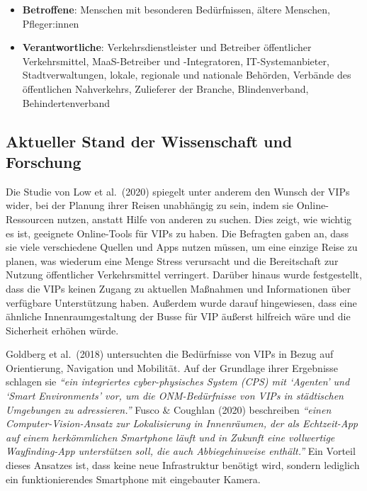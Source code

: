 \documentclass[
]{book}
\providecommand{\tightlist}{%
  \setlength{\itemsep}{0pt}\setlength{\parskip}{0pt}}
\begin{document}
\begin{itemize}
\tightlist
\item
  \textbf{Betroffene}: Menschen mit besonderen Bedürfnissen, ältere Menschen, Pfleger:innen
\item
  \textbf{Verantwortliche}: Verkehrsdienstleister und Betreiber öffentlicher Verkehrsmittel, MaaS-Betreiber und -Integratoren, IT-Systemanbieter, Stadtverwaltungen, lokale, regionale und nationale Behörden, Verbände des öffentlichen Nahverkehrs, Zulieferer der Branche, Blindenverband, Behindertenverband
\end{itemize}

\hypertarget{aktueller-stand-der-wissenschaft-und-forschung-27}{%
\subsection*{Aktueller Stand der Wissenschaft und Forschung}\label{aktueller-stand-der-wissenschaft-und-forschung-27}}

Die Studie von Low et al.~(2020) spiegelt unter anderem den Wunsch der VIPs wider, bei der Planung ihrer Reisen unabhängig zu sein, indem sie Online-Ressourcen nutzen, anstatt Hilfe von anderen zu suchen. Dies zeigt, wie wichtig es ist, geeignete Online-Tools für VIPs zu haben. Die Befragten gaben an, dass sie viele verschiedene Quellen und Apps nutzen müssen, um eine einzige Reise zu planen, was wiederum eine Menge Stress verursacht und die Bereitschaft zur Nutzung öffentlicher Verkehrsmittel verringert. Darüber hinaus wurde festgestellt, dass die VIPs keinen Zugang zu aktuellen Maßnahmen und Informationen über verfügbare Unterstützung haben. Außerdem wurde darauf hingewiesen, dass eine ähnliche Innenraumgestaltung der Busse für VIP äußerst hilfreich wäre und die Sicherheit erhöhen würde.

Goldberg et al.~(2018) untersuchten die Bedürfnisse von VIPs in Bezug auf Orientierung, Navigation und Mobilität. Auf der Grundlage ihrer Ergebnisse schlagen sie \emph{``ein integriertes cyber-physisches System (CPS) mit `Agenten' und `Smart Environments' vor, um die ONM-Bedürfnisse von VIPs in städtischen Umgebungen zu adressieren.''} Fusco \& Coughlan (2020) beschreiben \emph{``einen Computer-Vision-Ansatz zur Lokalisierung in Innenräumen, der als Echtzeit-App auf einem herkömmlichen Smartphone läuft und in Zukunft eine vollwertige Wayfinding-App unterstützen soll, die auch Abbiegehinweise enthält.''} Ein Vorteil dieses Ansatzes ist, dass keine neue Infrastruktur benötigt wird, sondern lediglich ein funktionierendes Smartphone mit eingebauter Kamera.
\end{document}
